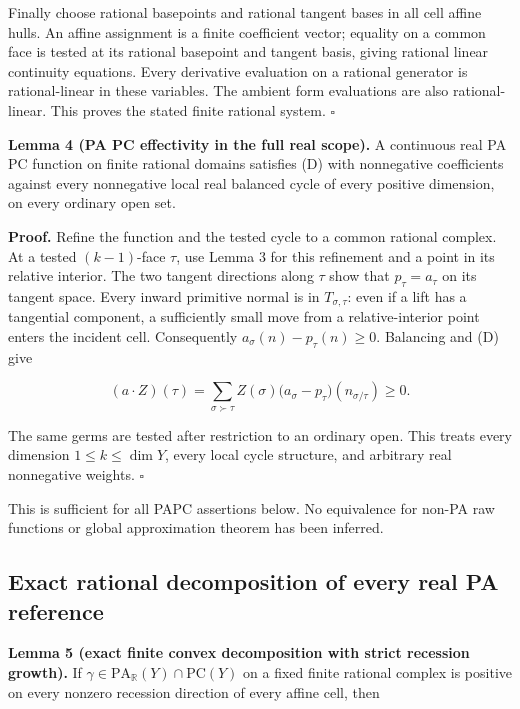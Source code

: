 \documentclass[
  10pt,
]{article}
\begin{document}
Finally choose rational basepoints and rational tangent bases in all
cell affine hulls. An affine assignment is a finite coefficient vector;
equality on a common face is tested at its rational basepoint and
tangent basis, giving rational linear continuity equations. Every
derivative evaluation on a rational generator is rational-linear in
these variables. The ambient form evaluations are also rational-linear.
This proves the stated finite rational system. \(\square\)

\textbf{Lemma 4 (PA PC effectivity in the full real scope).} A
continuous real PA PC function on finite rational domains satisfies (D)
with nonnegative coefficients against every nonnegative local real
balanced cycle of every positive dimension, on every ordinary open set.

\textbf{Proof.} Refine the function and the tested cycle to a common
rational complex. At a tested \((k-1)\)-face \(\tau\), use Lemma 3 for
this refinement and a point in its relative interior. The two tangent
directions along \(\tau\) show that \(p_\tau=a_\tau\) on its tangent
space. Every inward primitive normal is in \(T_{\sigma,\tau}\): even if
a lift has a tangential component, a sufficiently small move from a
relative-interior point enters the incident cell. Consequently
\(a_\sigma(n)-p_\tau(n)\geq0\). Balancing and (D) give

\[
(a\cdot Z)(\tau)=\sum_{\sigma\succ\tau}Z(\sigma)
\bigl(a_\sigma-p_\tau\bigr)(n_{\sigma/\tau})\geq0.
\]

The same germs are tested after restriction to an ordinary open. This
treats every dimension \(1\leq k\leq\dim Y\), every local cycle
structure, and arbitrary real nonnegative weights. \(\square\)

This is sufficient for all PAPC assertions below. No equivalence for
non-PA raw functions or global approximation theorem has been inferred.

\subsection{Exact rational decomposition of every real PA
reference}\label{exact-rational-decomposition-of-every-real-pa-reference}

\textbf{Lemma 5 (exact finite convex decomposition with strict recession
growth).} If \(\gamma\in\mathrm{PA}_{\mathbb R}(Y)\cap\mathrm{PC}(Y)\)
on a fixed finite rational complex is positive on every nonzero
recession direction of every affine cell, then
\end{document}
